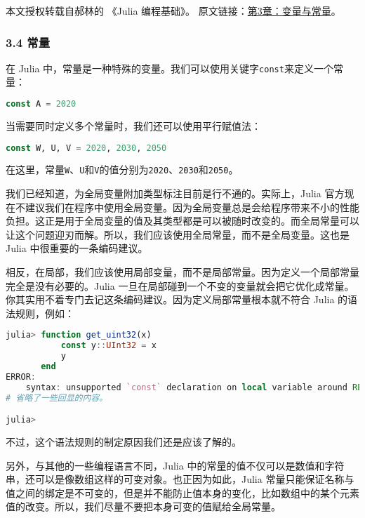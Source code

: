 
本文授权转载自郝林的 《Julia 编程基础》。 原文链接：\href{https://github.com/hyper0x/JuliaBasics/blob/master/book/ch03.md}{第3章：变量与常量}。


\subsubsection{3.4 常量}

在 Julia 中，常量是一种特殊的变量。我们可以使用关键字\verb`const`来定义一个常量：

\begin{lstlisting}[language=julia]
const A = 2020
\end{lstlisting}

当需要同时定义多个常量时，我们还可以使用平行赋值法：

\begin{lstlisting}[language=julia]
const W, U, V = 2020, 2030, 2050
\end{lstlisting}

在这里，常量\verb`W`、\verb`U`和\verb`V`的值分别为\verb`2020`、\verb`2030`和\verb`2050`。

我们已经知道，为全局变量附加类型标注目前是行不通的。实际上，Julia 官方现在不建议我们在程序中使用全局变量。因为全局变量总是会给程序带来不小的性能负担。这正是用于全局变量的值及其类型都是可以被随时改变的。而全局常量可以让这个问题迎刃而解。所以，我们应该使用全局常量，而不是全局变量。这也是 Julia 中很重要的一条编码建议。

相反，在局部，我们应该使用局部变量，而不是局部常量。因为定义一个局部常量完全是没有必要的。Julia 一旦在局部碰到一个不变的变量就会把它优化成常量。你其实用不着专门去记这条编码建议。因为定义局部常量根本就不符合 Julia 的语法规则，例如：

\begin{lstlisting}[language=julia]
julia> function get_uint32(x)
           const y::UInt32 = x
           y
       end
ERROR: 
    syntax: unsupported `const` declaration on local variable around REPL[1]:2
# 省略了一些回显的内容。

julia> 
\end{lstlisting}

不过，这个语法规则的制定原因我们还是应该了解的。

另外，与其他的一些编程语言不同，Julia 中的常量的值不仅可以是数值和字符串，还可以是像数组这样的可变对象。也正因为如此，Julia 常量只能保证名称与值之间的绑定是不可变的，但是并不能防止值本身的变化，比如数组中的某个元素值的改变。所以，我们尽量不要把本身可变的值赋给全局常量。


